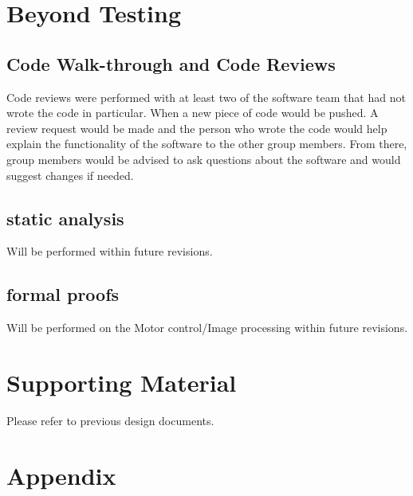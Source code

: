 \documentclass [10pt]{article}
\begin{document}
\section {Beyond Testing}

\subsection {Code Walk-through and Code Reviews}
Code reviews were performed with at least two of the software team that had not wrote the code in particular. When a new piece of code would be pushed. A review request would be made and the person who wrote the code would help explain the functionality of the software to the other group members. From there, group members would be advised to ask questions about the software and would suggest changes if needed.

\subsection {static analysis}
Will be performed within future revisions.

\subsection { formal proofs}
Will be performed on the Motor control/Image processing within future revisions.

\section {Supporting Material}

Please refer to previous design documents.

\section {Appendix}
\end{document}
